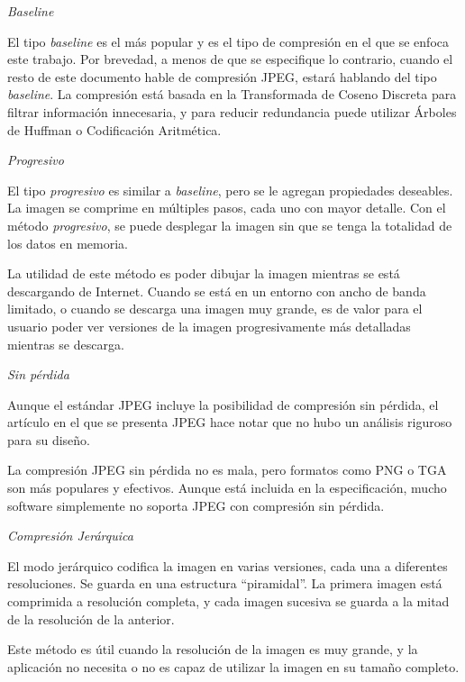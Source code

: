 \begin{list}{}{} \item \emph{Baseline}

El tipo \emph{\gls{baseline}} es el más popular y es el tipo de compresión en el que
se enfoca este trabajo. Por brevedad, a menos de que se especifique lo
contrario, cuando el resto de este documento hable de compresión JPEG, estará
hablando del tipo \emph{baseline}. La compresión está basada en la Transformada
de Coseno Discreta para filtrar información innecesaria, y para reducir
redundancia puede utilizar Árboles de Huffman o Codificación Aritmética.

\item \emph{Progresivo}

El tipo \emph{progresivo} es similar a \emph{baseline}, pero se le agregan
propiedades deseables. La imagen se comprime en múltiples pasos, cada uno con
mayor detalle. Con el método \emph{progresivo}, se puede desplegar la imagen
sin que se tenga la totalidad de los datos en memoria.

La utilidad de este método es poder dibujar la imagen mientras se está
descargando de Internet. Cuando se está en un entorno con ancho de banda
limitado, o cuando se descarga una imagen muy grande, es de valor para el
usuario poder ver versiones de la imagen progresivamente más detalladas
mientras se descarga.

\item \emph{Sin pérdida}

Aunque el estándar JPEG incluye la posibilidad de compresión sin pérdida, el
artículo en el que se presenta JPEG \cite{jpeg-paper} hace notar que no hubo un
análisis riguroso para su diseño.

La compresión JPEG sin pérdida no es mala, pero formatos como PNG o TGA son más
populares y efectivos. Aunque está incluida en la especificación, mucho
software simplemente no soporta JPEG con compresión sin pérdida.

\item \emph{Compresión Jerárquica}

El modo jerárquico codifica la imagen en varias versiones, cada una a
diferentes resoluciones. Se guarda en una estructura ``piramidal''. La primera
imagen está comprimida a resolución completa, y cada imagen sucesiva se guarda
a la mitad de la resolución de la anterior.

Este método es útil cuando la resolución de la imagen es muy grande, y la
aplicación no necesita o no es capaz de utilizar la imagen en su tamaño
completo.

\end{list}

